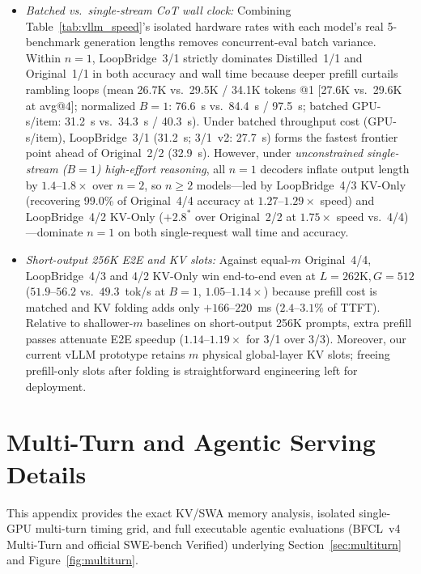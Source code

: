 \documentclass[11pt]{article}
\begin{document}
\begin{itemize}
33.7\%, 5.9 max 256K seqs).
\item \emph{Batched vs.\ single-stream CoT wall clock:} Combining Table~\ref{tab:vllm_speed}'s isolated hardware
rates with each model's real 5-benchmark generation lengths removes concurrent-eval batch variance. Within $n{=}1$,
LoopBridge~3/1 strictly dominates Distilled~1/1 and Original~1/1 in both accuracy and wall time because deeper prefill
curtails rambling loops (mean 26.7K vs.\ 29.5K / 34.1K tokens @1 [27.6K vs.\ 29.6K at avg@4]; normalized $B{=}1$: 76.6~s vs.\ 84.4~s / 97.5~s; batched
GPU-s/item: 31.2~s vs.\ 34.3~s / 40.3~s). Under batched throughput cost (GPU-s/item), LoopBridge~3/1 (31.2~s; 3/1~v2:
27.7~s) forms the fastest frontier point ahead of Original~2/2 (32.9~s). However, under \emph{unconstrained single-stream
($B{=}1$) high-effort reasoning}, all $n{=}1$ decoders inflate output length by $1.4$--$1.8\times$ over $n{=}2$, so
$n\ge2$ models---led by LoopBridge~4/3 KV-Only (recovering 99.0\% of Original~4/4 accuracy at $1.27$--$1.29\times$ speed) and
LoopBridge~4/2 KV-Only ($+2.8^\ast$ over Original~2/2 at $1.75\times$ speed vs.\ 4/4)---dominate $n{=}1$ on both
single-request wall time and accuracy.
\item \emph{Short-output 256K E2E and KV slots:} Against equal-$m$ Original~4/4, LoopBridge~4/3 and 4/2 KV-Only win
end-to-end even at $L{=}262\text{K}, G{=}512$ ($51.9$--$56.2$ vs.\ $49.3$~tok/s at $B{=}1$, $1.05$--$1.14\times$) because
prefill cost is matched and KV folding adds only $+166$--$220$~ms ($2.4$--$3.1\%$ of TTFT). Relative to shallower-$m$
baselines on short-output 256K prompts, extra prefill passes attenuate E2E speedup ($1.14$--$1.19\times$ for 3/1 over
3/3). Moreover, our current vLLM prototype retains $m$ physical global-layer KV slots; freeing prefill-only slots after
folding is straightforward engineering left for deployment.
\end{itemize}

\FloatBarrier
\section{Multi-Turn and Agentic Serving Details}
\label{app:multiturn}

This appendix provides the exact KV/SWA memory analysis, isolated single-GPU multi-turn timing grid, and full executable
agentic evaluations (BFCL~v4 Multi-Turn and official SWE-bench Verified) underlying Section~\ref{sec:multiturn} and
Figure~\ref{fig:multiturn}.
\end{document}
